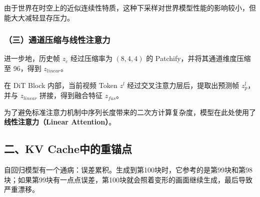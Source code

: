 由于世界在时空上的近似连续性特质，这种下采样对世界模型性能的影响较小，但能大大减轻显存压力。

\hypertarget{ux4e09ux901aux9053ux538bux7f29ux4e0eux7ebfux6027ux6ce8ux610fux529b}{%
\subsubsection{（三）通道压缩与线性注意力}\label{ux4e09ux901aux9053ux538bux7f29ux4e0eux7ebfux6027ux6ce8ux610fux529b}}

进一步地，历史帧 \(z_c\) 经过压缩率为 \((8,4,4)\) 的 Patchify，并将其通道维度压缩至 96，得到 \(z_{linear}\)。

在 DiT Block 内部，当前视频 Token \(z^l\) 经过交叉注意力层后，提取出预测帧 \(z_p^l\)，并与 \(z_{linear}\) 拼接，得到融合特征 \(z_{fus}\)。

为了避免标准注意力机制中序列长度带来的二次方计算复杂度，模型在此处使用了\textbf{线性注意力（Linear Attention）}。

\hypertarget{ux4e8ckv-cacheux4e2dux7684ux91cdux951aux70b9}{%
\subsection{二、KV Cache中的重锚点}\label{ux4e8ckv-cacheux4e2dux7684ux91cdux951aux70b9}}

自回归模型有一个通病：误差累积。生成到第100块时，它参考的是第99块和第98块；如果第99块有一点点误差，第100块就会照着变形的画面继续生成，最后导致严重漂移。

